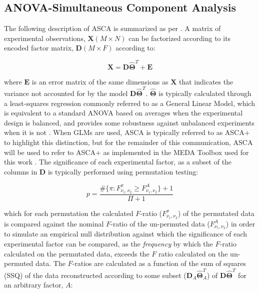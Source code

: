 \documentclass[preprint,12pt]{elsarticle}
\begin{document}
\subsection{ANOVA-Simultaneous Component Analysis}\label{sec:glm}

The following description of ASCA is summarized as per \cite{camacho2023permutation}. A matrix of experimental observations, $\mathbf{X} (M \times N)$ can be factorized according to its encoded factor matrix, $\mathbf{D} (M \times F)$ according to:

\begin{equation}
    \mathbf{X} = \mathbf{D} \mathbf{\hat{\Theta}}^T + \mathbf{E}
\end{equation}

\noindent where $\mathbf{E}$ is an error matrix of the same dimensions as $\mathbf{X}$ that indicates the variance not accounted for by the model $\mathbf{D} \mathbf{\hat{\Theta}}^T$. $\mathbf{\hat{\Theta}}$ is typically calculated through a least-squares regression commonly referred to as a General Linear Model, which is equivalent to a standard ANOVA based on averages when the experimental design is balanced, and provides some robustness against unbalanced experiments when it is not \cite{smilde2005anova}. When GLMs are used, ASCA is typically referred to as ASCA+ to highlight this distinction, but for the remainder of this communication, ASCA will be used to refer to ASCA+ as implemented in the MEDA Toolbox used for this work \cite{camacho2015multivariate}. The significance of each experimental factor, as a subset of the columns in $\mathbf{D}$ is typically performed using permutation testing:

\begin{equation}\label{eq:perm1}
p = \frac{\#\{\pi:F^\pi_{\nu_1,\nu_2} \geq F^{A}_{\nu_1,\nu_2}\} + 1}{\Pi+1}
\end{equation}

\noindent which for each permutation the calculated $F$-ratio ($F^\pi_{\nu_1,\nu_2}$) of the permutated data is compared against the nominal $F$-ratio of the un-permuted data ($F^{A}_{\nu_1,\nu_2}$) in order to simulate an empirical null distribution against which the significance of each experimental factor can be compared, as the \textit{frequency} by which the $F$-ratio calculated on the permutated data, exceeds the $F$ ratio calculated on the un-permuted data. The $F$-ratios are calculated as a function of the sum of squares (SSQ) of the data reconstructed according to some subset ($\mathbf{D}_A\mathbf{\hat{\Theta}}_A^T$) of $\mathbf{D}\mathbf{\hat{\Theta}}^T$ for an arbitrary factor, $A$:
\end{document}
